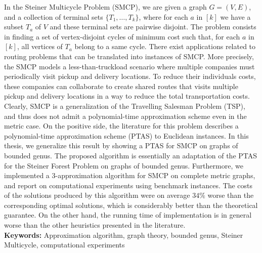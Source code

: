 
In the Steiner Multicycle Problem (SMCP), we are given a graph \(G = (V, E)\), and a collection of terminal sets \(\{T_1, \dots , T_k\}\), where for each \(a\) in \([k]\) we have a subset \(T_a\) of \(V\) and these terminal sets are pairwise disjoint. The problem consists in finding a set of vertex-disjoint cycles of minimum cost such that, for each \(a\) in \([k]\), all vertices of \(T_a\) belong to a same cycle. 
There exist applications related to routing problems that can be translated into instances of SMCP.
More precisely, the SMCP models a less-than-truckload scenario where multiple companies must periodically visit pickup and delivery locations.
To reduce their individuals costs, these companies can collaborate to create shared routes that visits multiple pickup and delivery locations in a way to reduce the total transportation costs.
Clearly, SMCP is a generalization of the Travelling Salesman Problem (TSP),  and thus does not admit a polynomial-time approximation scheme even in the metric case.
On the positive side, the literature for this problem describes a polynomial-time approximation scheme (PTAS) to Euclidean instances.
In this thesis, we generalize this result by showing a PTAS for SMCP on graphs of bounded genus.
The proposed algorithm is essentially an adaptation of the PTAS for the Steiner Forest Problem on graphs of bounded genus.
Furthermore, we implemented a 3-approximation algorithm for SMCP on complete metric graphs, and report on computational experiments using benchmark instances. 
The costs of the solutions produced by this algorithm  were on average \(34\%\) worse than the corresponding optimal solutions, which is considerably better than the theoretical guarantee. 
On the other hand, the running time of implementation is in general worse than the other heuristics presented in the literature.
\hfill\\

\noindent\textbf{Keywords:} Approximation algorithm, graph theory, bounded genus, Steiner Multicycle, computational experiments
